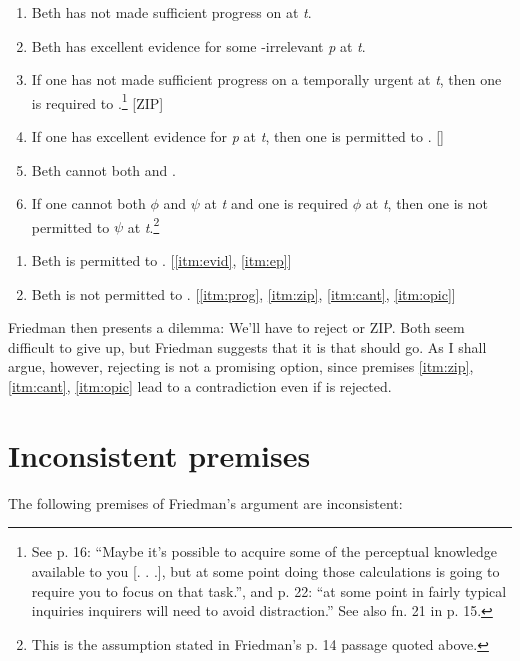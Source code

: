 \documentclass[12pt]{article}
\begin{document}
\begin{enumerate}[label=(P\arabic*),ref=P\arabic*]
    \item\label{itm:prog} Beth has not made sufficient progress on  at \textit{t}.
    \item\label{itm:evid} Beth has excellent evidence for some -irrelevant \textit{p} at \textit{t}.
    \item\label{itm:zip} If one has not made sufficient progress on a temporally urgent  at \textit{t}, then one is required to \foc{}.\footnote{See p. 16: ``Maybe it’s possible to acquire some of the perceptual knowledge available to you [. . .], but at some point doing those calculations is going to require you to focus on that task.'', and p. 22: ``at some point in fairly typical inquiries inquirers will need to avoid distraction.'' See also fn. 21 in p. 15.} [ZIP]
    \item\label{itm:ep} If one has excellent evidence for \textit{p} at \textit{t}, then one is permitted to \jud{}. [\ep{}]
    \item\label{itm:cant} Beth cannot both \jud{} and \foc{}.
    \item\label{itm:opic} If one cannot both $\phi$ and $\psi$ at \textit{t} and one is required $\phi$ at \textit{t}, then one is not permitted to $\psi$ at \textit{t}.\footnote{This is the assumption stated in Friedman's p. 14 passage quoted above.}
\end{enumerate}
\begin{enumerate}[label=(C\arabic*),ref=C\arabic*]
    \item\label{itm:perm} Beth is permitted to \jud{}. [\ref*{itm:evid}, \ref*{itm:ep}]
    \item\label{itm:forb} Beth is not permitted to \jud{}. [\ref*{itm:prog}, \ref*{itm:zip}, \ref*{itm:cant}, \ref*{itm:opic}]
\end{enumerate}
%
\newcommand{\psub}{\ref*{itm:zip}, \ref*{itm:cant}, \ref*{itm:opic}}
%
Friedman then presents a dilemma: We'll have to reject \ep{} or ZIP. Both seem difficult to give up, but Friedman suggests that it is \ep{} that should go. As I shall argue, however, rejecting \ep{} is not a promising option, since premises \psub{} lead to a contradiction even if \ep{} is rejected.

\section{Inconsistent premises}
The following premises of Friedman's argument are inconsistent:
\end{document}
